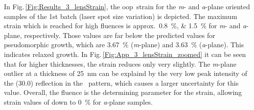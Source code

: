 In Fig.\,\ref{Fig:Results_3_lensStrain}, the \gls{oop}\ strain for the \textit{m}- and \textit{a}-plane oriented samples of the 1st batch (laser spot size variation) is depicted.
The maximum strain which is reached for high fluences is approx.\ \qtylist{0.8;1.5}{\percent} for \textit{m}- and \textit{a}-plane, respectively.
Those values are far below the predicted values for pseudomorphic growth, which are \qty{3.67}{\percent} (\textit{m}-plane) and \qty{3.63}{\percent} (\textit{a}-plane).
This indicates relaxed growth.
In Fig.\,\ref{Fig:App_3_lensStrain_zoomed} it can be seen that for higher thicknesses, the strain reduces only very slightly.
The \textit{m}-plane outlier at a thickness of \qty{25}{\nm} can be explaind by the very low peak intensity of the (30.0) reflection in the \thetaomega\ pattern, which causes a larger uncertainty for this value.
Overall, the fluence is the determining parameter for the strain, allowing strain values of down to \qty{0}{\percent} for \textit{a}-plane samples.


